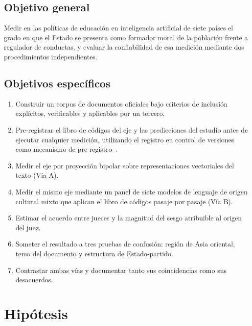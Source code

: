 \subsection{Objetivo general}
\label{subsec:objetivo-general}

Medir en las políticas de educación en inteligencia artificial de siete países el grado en que el Estado se presenta como formador moral de la población frente a regulador de conductas, y evaluar la confiabilidad de esa medición mediante dos procedimientos independientes.

\subsection{Objetivos específicos}
\label{subsec:objetivos-especificos}

\begin{enumerate}
  \item[\textbf{OE1.}] Construir un corpus de documentos oficiales bajo criterios de inclusión explícitos, verificables y aplicables por un tercero.

  \item[\textbf{OE2.}] Pre-registrar el libro de códigos del eje \ejedf y las predicciones del estudio antes de ejecutar cualquier medición, utilizando el registro en control de versiones como mecanismo de pre-registro~\citep{nosek2018preregistration}.

  \item[\textbf{OE3.}] Medir el eje por proyección bipolar sobre representaciones vectoriales del texto (Vía A).

  \item[\textbf{OE4.}] Medir el mismo eje mediante un panel de siete modelos de lenguaje de origen cultural mixto que aplican el libro de códigos pasaje por pasaje (Vía B).

  \item[\textbf{OE5.}] Estimar el acuerdo entre jueces y la magnitud del sesgo atribuible al origen del juez.

  \item[\textbf{OE6.}] Someter el resultado a tres pruebas de confusión: región de Asia oriental, tema del documento y estructura de Estado-partido.

  \item[\textbf{OE7.}] Contrastar ambas vías y documentar tanto sus coincidencias como sus desacuerdos.
\end{enumerate}


\section{Hipótesis}
\label{sec:hipotesis}

